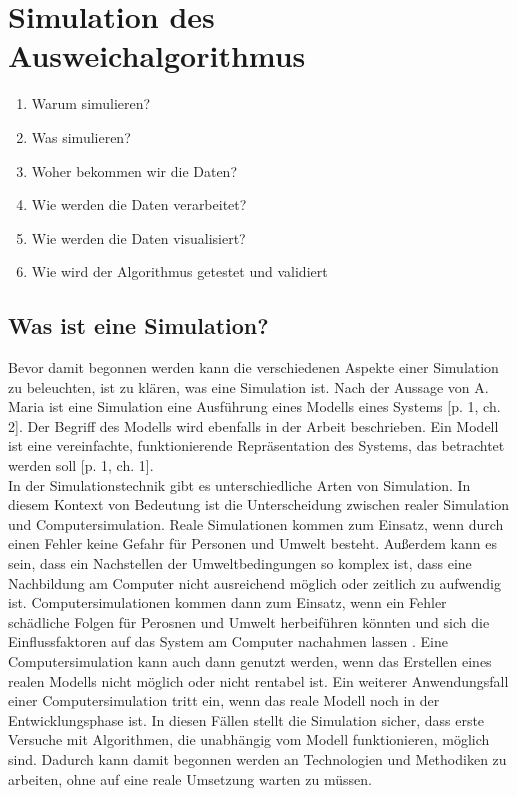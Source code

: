 \section{Simulation des Ausweichalgorithmus}

\begin{enumerate}
    \item Warum simulieren?
    \item Was simulieren?
    \item Woher bekommen wir die Daten?
    \item Wie werden die Daten verarbeitet?
    \item Wie werden die Daten visualisiert?
    \item Wie wird der Algorithmus getestet und validiert
\end{enumerate}

 \subsection{Was ist eine Simulation?}
 Bevor damit begonnen werden kann die verschiedenen Aspekte einer Simulation zu beleuchten, ist zu klären, was eine Simulation ist.
 Nach der Aussage von A. Maria ist eine Simulation eine Ausführung eines Modells eines Systems \cite{maria1997introduction}[p. 1, ch. 2].
Der Begriff des Modells wird ebenfalls in der Arbeit beschrieben. Ein Modell ist eine vereinfachte, funktionierende Repräsentation des Systems, das betrachtet werden soll \cite{maria1997introduction}[p. 1, ch. 1].\\
In der Simulationstechnik gibt es unterschiedliche Arten von Simulation. In diesem Kontext von Bedeutung ist die Unterscheidung zwischen realer Simulation und Computersimulation. Reale Simulationen kommen zum Einsatz, wenn durch einen Fehler keine Gefahr für Personen und Umwelt besteht.
Außerdem kann es sein, dass ein Nachstellen der Umweltbedingungen so komplex ist, dass eine Nachbildung am Computer nicht ausreichend möglich oder zeitlich zu aufwendig ist. Computersimulationen kommen dann zum Einsatz, wenn ein Fehler schädliche Folgen für Perosnen und Umwelt
herbeiführen könnten und sich die Einflussfaktoren auf das System am Computer nachahmen lassen \cite{Britannica2023}. 
Eine Computersimulation kann auch dann genutzt werden, wenn das Erstellen eines realen Modells nicht möglich oder nicht rentabel ist. Ein weiterer Anwendungsfall einer Computersimulation tritt ein, wenn das reale Modell noch in der Entwicklungsphase ist. In diesen Fällen stellt die Simulation sicher, dass erste Versuche mit Algorithmen, die unabhängig vom Modell funktionieren, möglich sind. 
Dadurch kann damit begonnen werden an Technologien und Methodiken zu arbeiten, ohne auf eine reale Umsetzung warten zu müssen.
